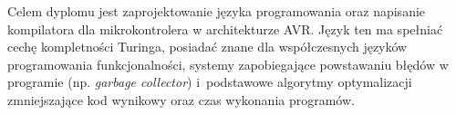 \documentclass[12pt]{article}
\begin{document}
Celem dyplomu jest zaprojektowanie języka programowania oraz napisanie kompilatora dla mikrokontrolera w architekturze AVR. Język ten ma spełniać cechę kompletności Turinga, posiadać znane dla współczesnych języków programowania funkcjonalności, systemy zapobiegające powstawaniu błędów w programie (np. \foreignlanguage{british}{\emph{garbage collector}}) i~podstawowe algorytmy optymalizacji zmniejszające kod wynikowy oraz czas wykonania programów.
\end{document}
